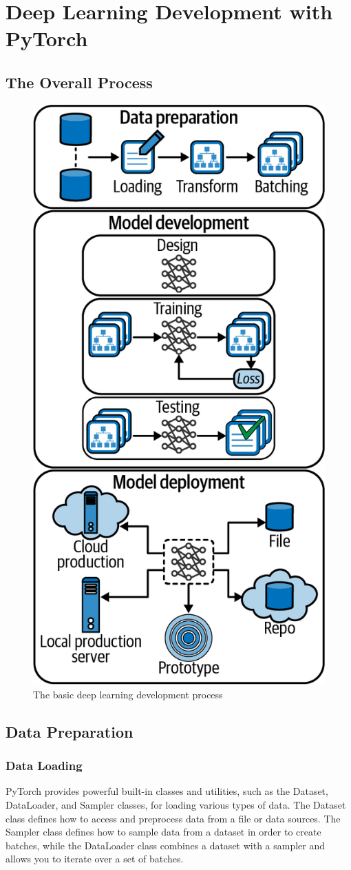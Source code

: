 \chapter{Deep Learning Development with PyTorch\label{Ch03}}
\section{The Overall Process}
\begin{figure}
    \centering
    \includegraphics[width=.65\textwidth]{img/fig3-1.png}
    \caption{The basic deep learning development process}
    \label{fig3-1}
\end{figure}
\section{Data Preparation}
\subsection{Data Loading}
PyTorch provides powerful built-in classes and utilities, such as
the \textsf{Dataset}, \textsf{DataLoader}, and \textsf{Sampler} classes, for loading various types of data. The Dataset class defines how to access and
preprocess data from a file or data sources. The Sampler class
defines how to sample data from a dataset in order to create
batches, while the DataLoader class combines a dataset with a
sampler and allows you to iterate over a set of batches.

